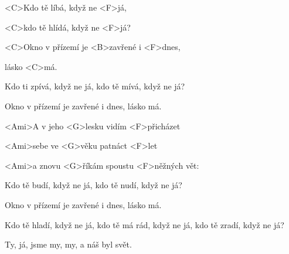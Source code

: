 

\zs
<C>Kdo tě líbá, když ne <F>já,

<C>kdo tě hlídá, když ne <F>já?

<C>Okno v přízemí je <B>zavřené i <F>dnes,

lásko <C>má.
\ks

\zs
Kdo ti zpívá, když ne já, kdo tě mívá, když ne já?

Okno v přízemí je zavřené i dnes, lásko má.
\ks

\zr
<Ami>A v jeho <G>lesku vidím <F>přicházet

<Ami>sebe ve <G>věku patnáct <F>let

<Ami>a znovu <G>říkám spoustu <F>něžných vět:

\kr

\zs
Kdo tě budí, když ne já, kdo tě nudí, když ne já?

Okno v přízemí je zavřené i dnes, lásko má.
\ks

\zr\kr

\zs
Kdo tě hladí, když ne já, kdo tě má rád, když ne já, kdo tě zradí, když ne já?

Ty, já, jsme my, my, a náš byl svět.
\ks

\kp

